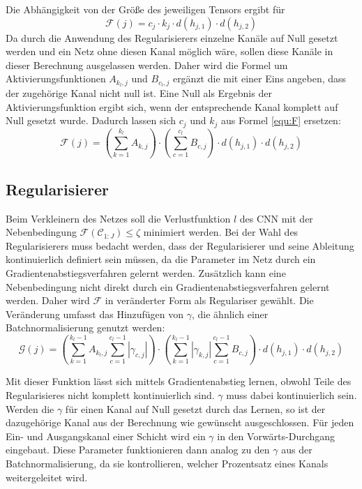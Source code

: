 Die Abhängigkeit von der Größe des jeweiligen Tensors ergibt für 
\begin{equation}\label{equ:F}
\mathcal{F}(j)=c_j \cdot k_j \cdot d(h_{j,1}) \cdot d(h_{j,2})  
\end{equation}
Da durch die Anwendung des Regularisierers einzelne Kanäle auf Null gesetzt werden und ein Netz ohne diesen Kanal möglich wäre, sollen diese Kanäle in dieser Berechnung ausgelassen werden. Daher wird die Formel um Aktivierungsfunktionen $A_{k_l,j}$ und $B_{c_l,j}$ ergänzt die mit einer Eins angeben, dass der zugehörige Kanal nicht null ist. Eine Null als Ergebnis der Aktivierungsfunktion ergibt sich, wenn der entsprechende Kanal komplett auf Null gesetzt wurde. Dadurch lassen sich $c_j$ und $k_j $ aus Formel \ref{equ:F} ersetzen:
\begin{equation}
\mathcal{F}(j)=\left(\sum_{k=1}^{k_l} A_{k,j} \right) \cdot \left(\sum_{c=1}^{c_l} B_{c,j}\right) \cdot d(h_{j,1}) \cdot d(h_{j,2})  
\end{equation}


\subsection{Regularisierer}
Beim Verkleinern des Netzes soll die Verlustfunktion $l$ des CNN mit der Nebenbedingung $\mathcal{F}(\mathcal{C}_{1:J})\leq \zeta$ minimiert werden. Bei der Wahl des Regularisierers muss bedacht werden, dass der Regularisierer und seine Ableitung kontinuierlich definiert sein müssen, da die Parameter im Netz durch ein Gradientenabstiegsverfahren gelernt werden. Zusätzlich kann eine Nebenbedingung nicht direkt durch ein Gradientenabstiegsverfahren gelernt werden. Daher wird $\mathcal{F}$ in veränderter Form als Regulariser gewählt. Die Veränderung umfasst das Hinzufügen von $\gamma$, die ähnlich einer Batchnormalisierung genutzt werden:
\begin{equation}
\mathcal{G}(j)=\left(\sum_{k=1}^{k_l-1} A_{k_l,j} \sum_{c=1}^{c_l-1} |\gamma_{c, j} | \right) \cdot \left(\sum_{k=1}^{k_l-1} |\gamma_{k,j} |   \sum_{c=1}^{c_l-1} B_{c,j}\right) \cdot d(h_{j,1}) \cdot d(h_{j,2})  
\end{equation}

Mit dieser Funktion lässt sich mittels Gradientenabstieg lernen, obwohl Teile des Regularisieres nicht komplett kontinuierlich sind. $\gamma$ muss dabei kontinuierlich sein. Werden die $\gamma$ für einen Kanal auf Null gesetzt durch das Lernen, so ist der dazugehörige Kanal aus der Berechnung wie gewünscht ausgeschlossen. Für jeden Ein- und Ausgangskanal einer Schicht wird ein $\gamma$ in den Vorwärts-Durchgang eingebaut. Diese Parameter funktionieren dann analog zu den $\gamma$ aus der Batchnormalisierung, da sie kontrollieren, welcher Prozentsatz eines Kanals weitergeleitet wird.



